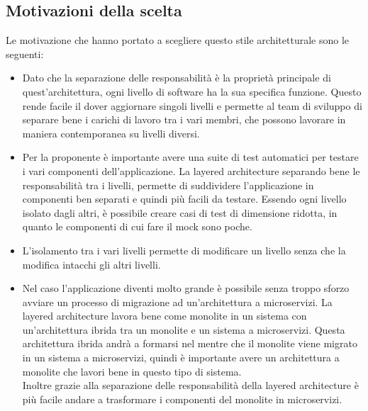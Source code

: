 \subsection{Motivazioni della scelta}
Le motivazione che hanno portato a scegliere questo stile architetturale sono le seguenti:
\begin{itemize}
    \item Dato che la separazione delle responsabilità è la proprietà principale di quest'architettura,
        ogni livello di software ha la sua specifica funzione. Questo rende facile il dover aggiornare 
        singoli livelli e permette al team di sviluppo di separare bene i carichi di lavoro tra i vari 
        membri, che possono lavorare in maniera contemporanea su livelli diversi.
    \item Per la proponente è importante avere una suite di test automatici per testare i vari componenti
        dell'applicazione. La layered architecture separando bene le responsabilità tra i livelli, 
        permette di suddividere l'applicazione in componenti ben separati e quindi più facili da testare.
        Essendo ogni livello isolato dagli altri, è possibile creare casi di test di dimensione ridotta, 
        in quanto le componenti di cui fare il mock sono poche.
    \item L'isolamento tra i vari livelli permette di modificare un livello senza che la modifica intacchi
        gli altri livelli.
    \item Nel caso l'applicazione diventi molto grande è possibile senza troppo sforzo avviare un processo
        di migrazione ad un'architettura a microservizi. La layered architecture lavora bene come monolite 
        in un sistema con un'architettura ibrida tra un monolite e un sistema a microservizi. Questa architettura
        ibrida andrà a formarsi nel mentre che il monolite viene migrato in un sistema a microservizi, quindi 
        è importante avere un architettura a monolite che lavori bene in questo tipo di sistema.
        \\
        Inoltre grazie alla separazione delle responsabilità della layered architecture è più facile andare
        a trasformare i componenti del monolite in microservizi.
\end{itemize}